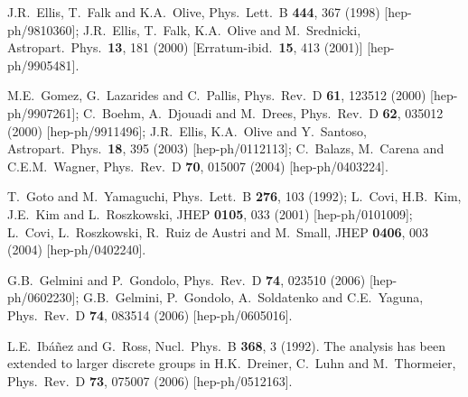 \documentclass[11pt]{article}
\begin{document}
\begin{thebibliography}{999}
J.R.~Ellis, T.~Falk and K.A.~Olive,
  Phys.\ Lett.\ B {\bf 444}, 367 (1998)
  [hep-ph/9810360];
J.R.~Ellis, T.~Falk, K.A.~Olive and M.~Srednicki,
  Astropart.\ Phys.\  {\bf 13}, 181 (2000)
  [Erratum-ibid.\  {\bf 15}, 413 (2001)]
  [hep-ph/9905481].

M.E.~Gomez, G.~Lazarides and C.~Pallis,
  Phys.\ Rev.\ D {\bf 61}, 123512 (2000)
  [hep-ph/9907261];
C.~Boehm, A.~Djouadi and M.~Drees,
  Phys.\ Rev.\ D {\bf 62}, 035012 (2000)
  [hep-ph/9911496];
J.R.~Ellis, K.A.~Olive and Y.~Santoso,
  Astropart.\ Phys.\  {\bf 18}, 395 (2003)
  [hep-ph/0112113];
C.~Balazs, M.~Carena and C.E.M.~Wagner,
  Phys.\ Rev.\ D {\bf 70}, 015007 (2004)
  [hep-ph/0403224].

T.~Goto and M.~Yamaguchi,
  Phys.\ Lett.\ B {\bf 276}, 103 (1992);
L.~Covi, H.B.~Kim, J.E.~Kim and L.~Roszkowski,
  JHEP {\bf 0105}, 033 (2001)
  [hep-ph/0101009];
L.~Covi, L.~Roszkowski, R.~Ruiz de Austri and M.~Small,
  JHEP {\bf 0406}, 003 (2004)
  [hep-ph/0402240].

G.B.~Gelmini and P.~Gondolo,
  Phys.\ Rev.\  D {\bf 74}, 023510 (2006)
  [hep-ph/0602230];
G.B.~Gelmini, P.~Gondolo, A.~Soldatenko and C.E.~Yaguna,
  Phys.\ Rev.\  D {\bf 74}, 083514 (2006)
  [hep-ph/0605016].

L.E.~Ib\'a\~nez and G.~Ross,
  Nucl.\ Phys.\ B {\bf 368}, 3 (1992).
The analysis has been extended to larger discrete groups in
H.K.~Dreiner, C.~Luhn and M.~Thormeier,
  Phys.\ Rev.\ D {\bf 73}, 075007 (2006)
  [hep-ph/0512163].  


\end{thebibliography}
\end{document}
